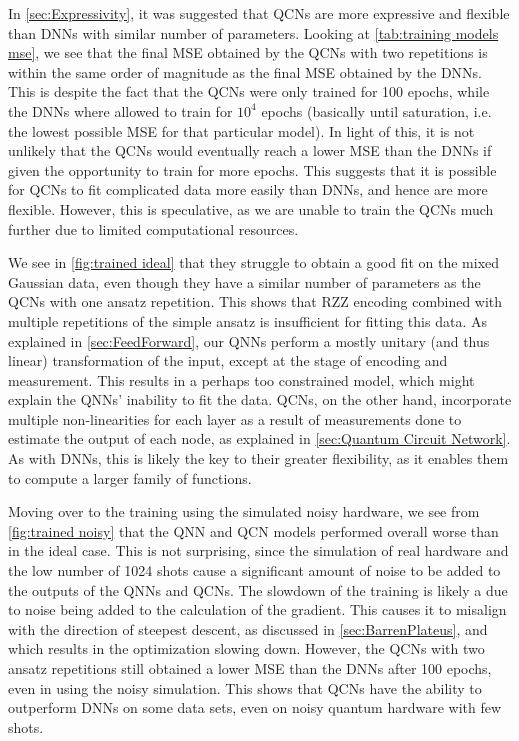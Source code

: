 In \autoref{sec:Expressivity}, it was suggested that QCNs are more expressive and flexible than DNNs with similar number of parameters. Looking at \autoref{tab:training models mse}, we see that the final MSE obtained by the QCNs with two repetitions is within the same order of magnitude as the final MSE obtained by the DNNs. This is despite the fact that the QCNs were only trained for 100 epochs, while the DNNs where allowed to train for $10^4$ epochs (basically until saturation, i.e. the lowest possible MSE for that particular model). In light of this, it is not unlikely that the QCNs would eventually reach a lower MSE than the DNNs if given the opportunity to train for more epochs. This suggests that it is possible for QCNs to fit complicated data more easily than DNNs, and hence are more flexible. However, this is speculative, as we are unable to train the QCNs much further due to limited computational resources.    

We see in \autoref{fig:trained ideal} that they struggle to obtain a good fit on the mixed Gaussian data, even though they have a similar number of parameters as the QCNs with one ansatz repetition. This shows that RZZ encoding combined with multiple repetitions of the simple ansatz is insufficient for fitting this data. As explained in \autoref{sec:FeedForward}, our QNNs perform a mostly unitary (and thus linear) transformation of the input, except at the stage of encoding and measurement. This results in a perhaps too constrained model, which might explain the QNNs' inability to fit the data. QCNs, on the other hand, incorporate multiple non-linearities for each layer as a result of measurements done to estimate the output of each node, as explained in \autoref{sec:Quantum Circuit Network}. As with DNNs, this is likely the key to their greater flexibility, as it enables them to compute a larger family of functions. 

Moving over to the training using the simulated noisy hardware, we see from \autoref{fig:trained noisy} that the QNN and QCN models performed overall worse than in the ideal case. This is not surprising, since the simulation of real hardware and the low number of 1024 shots cause a significant amount of noise to be added to the outputs of the QNNs and QCNs. The slowdown of the training is likely a due to noise being added to the calculation of the gradient. This causes it to misalign with the direction of steepest descent, as discussed in \autoref{sec:BarrenPlateus}, and which results in the optimization slowing down. However, the QCNs with two ansatz repetitions still obtained a lower MSE than the DNNs after 100 epochs, even in using the noisy simulation. This shows that QCNs have the ability to outperform DNNs on some data sets, even on noisy quantum hardware with few shots. 


